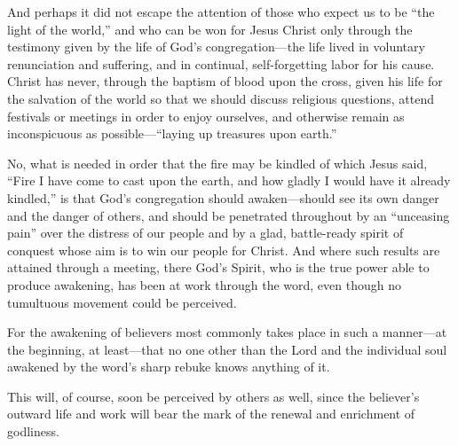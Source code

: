 And perhaps it did not escape the attention of those who expect us to be “the light of the world,” and who can be won for Jesus Christ only through the testimony given by the life of God’s congregation—the life lived in voluntary renunciation and suffering, and in continual, self-forgetting labor for his cause. Christ has never, through the baptism of blood upon the cross, given his life for the salvation of the world so that we should discuss religious questions, attend festivals or meetings in order to enjoy ourselves, and otherwise remain as inconspicuous as possible—“laying up treasures upon earth.”

No, what is needed in order that the fire may be kindled of which Jesus said, “Fire I have come to cast upon the earth, and how gladly I would have it already kindled,” is that God’s congregation should awaken—should see its own danger and the danger of others, and should be penetrated throughout by an “unceasing pain” over the distress of our people and by a glad, battle-ready spirit of conquest whose aim is to win our people for Christ. And where such results are attained through a meeting, there God’s Spirit, who is the true power able to produce awakening, has been at work through the word, even though no tumultuous movement could be perceived.

For the awakening of believers most commonly takes place in such a manner—at the beginning, at least—that no one other than the Lord and the individual soul awakened by the word’s sharp rebuke knows anything of it.

This will, of course, soon be perceived by others as well, since the believer’s outward life and work will bear the mark of the renewal and enrichment of godliness.